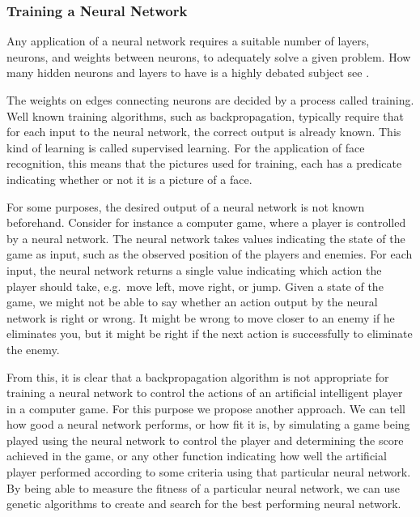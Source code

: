 \subsubsection{Training a Neural Network}
Any applica\-tion of a neural network requires a suitable number of layers, neurons, and weights between neurons, to adequately solve a given problem. How many hidden neurons and layers to have is a highly debated subject see \cite{sarle1997}.

The weights on edges connecting neurons are decided by a process called training. Well known training algorithms, such as backpropagation, typically require that for each input to the neural network, the correct output is already known. This kind of learning is called supervised learning. For the application of face recognition, this means that the pictures used for training, each has a predicate indicating whether or not it is a picture of a face.

For some purposes, the desired output of a neural network is not known beforehand. Consider for instance a computer game, where a player is controlled by a neural network. The neural network takes values indicating the state of the game as input, such as the observed position of the players and enemies. For each input, the neural network returns a single value indicating which action the player should take, e.g.\ move left, move right, or jump. Given a state of the game, we might not be able to say whether an action output by the neural network is right or wrong. It might be wrong to move closer to an enemy if he eliminates you, but it might be right if the next action is successfully to eliminate the enemy.

From this, it is clear that a backpropagation algorithm is not appropriate for training a neural network to control the actions of an artificial intelligent player in a computer game. For this purpose we propose another approach. We can tell how good a neural network performs, or how fit it is, by simulating a game being played using the neural network to control the player and determining the score achieved in the game, or any other function indicating how well the artificial player performed according to some criteria using that particular neural network. By being able to measure the fitness of a particular neural network, we can use genetic algorithms to create and search for the best performing neural network.
